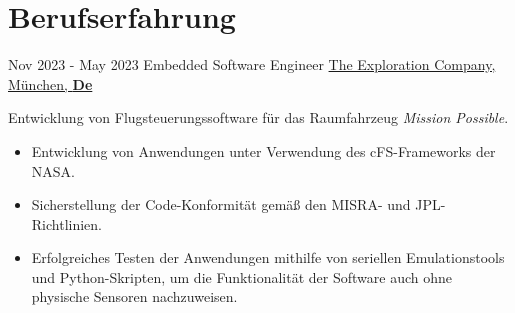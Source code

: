 \documentclass[letterpaper]{twentysecondcv} %
\begin{document}
\makeprofile %

%
%
\section{Berufserfahrung}

\begin{twenty} %

    \twentyitem
        {Nov 2023 -}
        {May 2023}
        {Embedded Software Engineer}
        {\href{https://www.exploration.space/}{The Exploration Company, München, \textbf{De}}}
        {}
        {
            Entwicklung von Flugsteuerungssoftware für das Raumfahrzeug \textit{Mission Possible}.
            \vspace{1 mm}
            \begin{itemize}
                \item Entwicklung von Anwendungen unter Verwendung des cFS-Frameworks der NASA.
                \item Sicherstellung der Code-Konformität gemäß den MISRA- und JPL-Richtlinien.
                \item Erfolgreiches Testen der Anwendungen mithilfe von seriellen Emulationstools und Python-Skripten, um die Funktionalität der Software auch ohne physische Sensoren nachzuweisen.
            \end{itemize}

}
\end{twenty}
\end{document}

